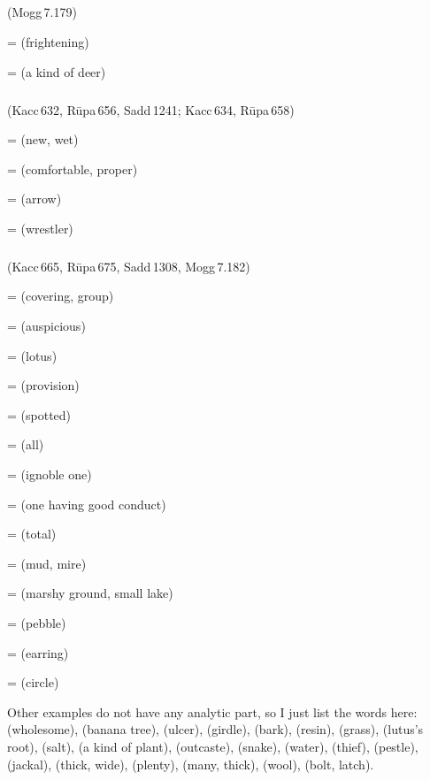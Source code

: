\subparagraph*{} (Mogg\,7.179)\label{pacckx:ruka}

 =  (frightening)\par
{} =  (a kind of deer)\par

\subparagraph*{} (Kacc\,632, R\=upa\,656, Sadd\,1241; Kacc\,634, R\=upa\,658)\label{pacckx:la1}

 =  (new, wet)\par
{} =  (comfortable, proper)\par
{} =  (arrow)\par
{} =  (wrestler)\par

\subparagraph*{} (Kacc\,665, R\=upa\,675, Sadd\,1308, Mogg\,7.182)\label{pacckx:ala}

 =  (covering, group)\par
{} =  (auspicious)\par
{} =  (lotus)\par
{} =  (provision)\par
{} =  (spotted)\par
{} =  (all)\par
{} =  (ignoble one)\par
{} =  (one having good conduct)\par
{} =  (total)\par
{} =  (mud, mire)\par
{} =  (marshy ground, small lake)\par
{} =  (pebble)\par
{} =  (earring)\par
{} =  (circle)\par

Other examples do not have any analytic part, so I just list the words here:  (wholesome),  (banana tree),  (ulcer),  (girdle),  (bark),  (resin),  (grass),  (lutus's root),  (salt),  (a kind of plant),  (outcaste),  (snake),  (water),  (thief),  (pestle),  (jackal),  (thick, wide),  (plenty),  (many, thick),  (wool),  (bolt, latch).

